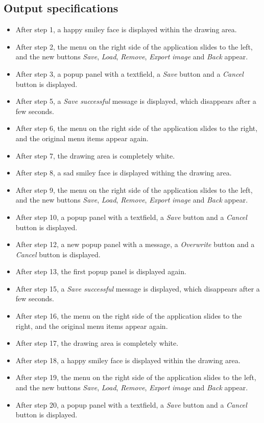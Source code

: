 \subsection*{Output specifications}
\begin{itemize}
\item After step 1, a happy smiley face is displayed within the drawing area.
\item After step 2, the menu on the right side of the application slides to the left, and the new buttons \emph{Save}, \emph{Load}, \emph{Remove}, \emph{Export image} and \emph{Back} appear.
\item After step 3, a popup panel with a textfield, a \emph{Save} button and a \emph{Cancel} button is displayed.
\item After step 5, a \emph{Save successful} message is displayed, which disappears after a few seconds.

\item After step 6, the menu on the right side of the application slides to the right, and the original menu items appear again.
\item After step 7, the drawing area is completely white.
\item After step 8, a sad smiley face is displayed withing the drawing area.
\item After step 9, the menu on the right side of the application slides to the left, and the new buttons \emph{Save}, \emph{Load}, \emph{Remove}, \emph{Export image} and \emph{Back} appear.
\item After step 10, a popup panel with a textfield, a \emph{Save} button and a \emph{Cancel} button is displayed.

\item After step 12, a new popup panel with a message, a \emph{Overwrite} button and a \emph{Cancel} button is displayed.
\item After step 13, the first popup panel is displayed again.
\item After step 15, a \emph{Save successful} message is displayed, which disappears after a few seconds.

\item After step 16, the menu on the right side of the application slides to the right, and the original menu items appear again.
\item After step 17, the drawing area is completely white.
\item After step 18, a happy smiley face is displayed within the drawing area.
\item After step 19, the menu on the right side of the application slides to the left, and the new buttons \emph{Save}, \emph{Load}, \emph{Remove}, \emph{Export image} and \emph{Back} appear.
\item After step 20, a popup panel with a textfield, a \emph{Save} button and a \emph{Cancel} button is displayed.


\end{itemize}
